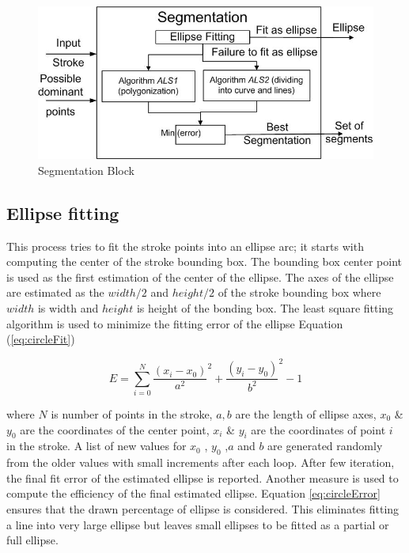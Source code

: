 \documentclass[10pt]{article}
\begin{document}
 \begin{figure}
	\centering
		\includegraphics[scale=0.48]{blockSmall.jpg}
	\caption{Segmentation Block}
	\label{fig:segblock}
\end{figure}
\subsection{Ellipse fitting}
This process tries to fit the stroke points into an ellipse arc; it starts with computing the center of the stroke bounding box. The bounding box center point is used as the first estimation of the center of the ellipse. The axes of the ellipse are estimated as the $width/2$ and $height/2$ of the stroke bounding box where $width$ is width and $height$ is height of the bonding box. The least square fitting algorithm \cite{chernov} is used to minimize the fitting error of the ellipse Equation (\ref{eq:circleFit})  

\begin{equation}
E = \sum\limits_{i = 0}^N {\frac{{(x_i - x_0 )}}{{a^2 }}^2  + \frac{{(y_i - y_0 )}}{{b^2 }}^2  - 1} 
\label{eq:circleFit}
\end{equation}

 where $N$ is number of points in the stroke, $a,b$ are the length of ellipse axes, $x_0$ \& $y_0$ are the coordinates of the center point, $x_i$ \& $y_i$ are the coordinates of point $i$ in the stroke. A list of new values for $x_0$ , $y_0$ ,$a$ and $b$ are generated randomly from the older values with small increments after each loop.  After few iteration, the final fit error of the estimated ellipse is reported. Another measure is used to compute the efficiency of the final estimated ellipse. Equation \ref{eq:circleError} ensures that the drawn percentage of ellipse is considered. This eliminates fitting a  line into very large ellipse but leaves small ellipses to be fitted as a partial or full ellipse. 
\end{document}
